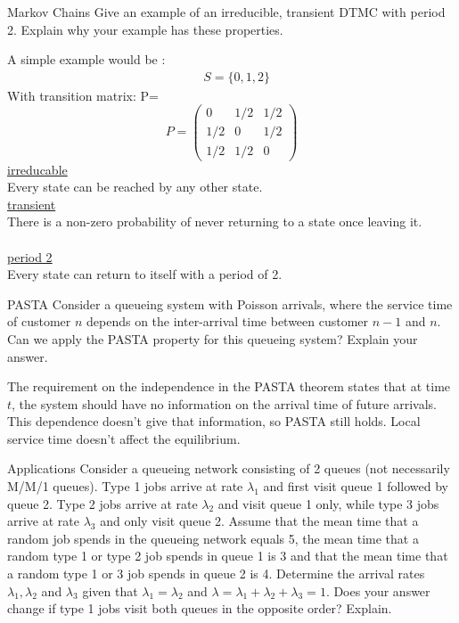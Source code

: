 \begin{problem}{Markov Chains}
Give an example of an irreducible, transient DTMC with period 2. Explain why your example has these properties.
\end{problem}
\begin{solution}
    A simple example would be :
    \begin{align*}
        &S=\{0,1,2\}
    \end{align*}
    With transition matrix:
    P=
    \[
        P = \begin{pmatrix}
                0 & 1/2 & 1/2 \\
                1/2 & 0 &1/2  \\
                1/2 & 1/2 & 0
        \end{pmatrix}
    \]
    \underline{irreducable}\\
    Every state can be reached by any other state.\\
    \underline{transient}\\
    There is a non-zero probability of never returning to a state once leaving it.\\
    \\
    \underline{period 2}\\
    Every state can return to itself with a period of 2.
\end{solution}
\begin{problem}{PASTA}
Consider a queueing system with Poisson arrivals, where the service time of customer \( n \) depends on the inter-arrival time between customer \( n - 1 \) and \( n \). Can we apply the PASTA property for this queueing system? Explain your answer.
\end{problem}

\begin{solution}
    The requirement on the independence in the PASTA theorem states that at time $t$, the system should have no information on the arrival time of future arrivals. This dependence doesn't give that information, so PASTA still holds. Local service time doesn't affect the equilibrium.
\end{solution}

\begin{problem}{Applications}
Consider a queueing network consisting of 2 queues (not necessarily M/M/1 queues). Type 1 jobs arrive at rate \( \lambda_1 \) and first visit queue 1 followed by queue 2. Type 2 jobs arrive at rate \( \lambda_2 \) and visit queue 1 only, while type 3 jobs arrive at rate \( \lambda_3 \) and only visit queue 2. Assume that the mean time that a random job spends in the queueing network equals 5, the mean time that a random type 1 or type 2 job spends in queue 1 is 3 and that the mean time that a random type 1 or 3 job spends in queue 2 is 4. Determine the arrival rates \( \lambda_1, \lambda_2 \) and \( \lambda_3 \) given that \( \lambda_1 = \lambda_2 \) and \( \lambda = \lambda_1 + \lambda_2 + \lambda_3 = 1 \). Does your answer change if type 1 jobs visit both queues in the opposite order? Explain.
\end{problem}

